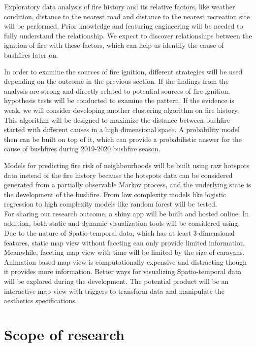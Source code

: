 \documentclass{monashthesis}
\begin{document}
Exploratory data analysis of fire history and its relative factors, like
weather condition, distance to the nearest road and distance to the
nearest recreation site will be performed. Prior knowledge and featuring
engineering will be needed to fully understand the relationship. We
expect to discover relationships between the ignition of fire with these
factors, which can help us identify the cause of bushfires later on.

In order to examine the sources of fire ignition, different strategies
will be used depending on the outcome in the previous section. If the
findings from the analysis are strong and directly related to potential
sources of fire ignition, hypothesis tests will be conducted to examine
the pattern. If the evidence is weak, we will consider developing
another clustering algorithm on fire history. This algorithm will be
designed to maximize the distance between bushfire started with
different causes in a high dimensional space. A probability model then
can be built on top of it, which can provide a probabilistic answer for
the cause of bushfires during 2019-2020 bushfire season.

Models for predicting fire risk of neighbourhoods will be built using
raw hotspots data instead of the fire history because the hotspots data
can be considered generated from a partially observable Markov process,
and the underlying state is the development of the bushfire. From low
complexity models like logistic regression to high complexity models
like random forest will be tested.\\
For sharing our research outcome, a shiny app will be built and hosted
online. In addition, both static and dynamic visualization tools will be
considered using. Due to the nature of Spatio-temporal data, which has
at least 3-dimensional features, static map view without faceting can
only provide limited information. Meanwhile, faceting map view with time
will be limited by the size of caravans. Animation based map view is
computationally expensive and distracting though it provides more
information. Better ways for visualizing Spatio-temporal data will be
explored during the development. The potential product will be an
interactive map view with triggers to transform data and manipulate the
aesthetics specifications.

\section{Scope of research}\label{scope-of-research}
\end{document}
